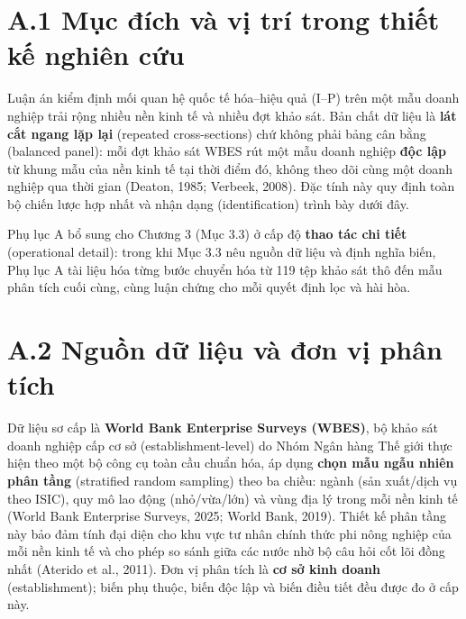 \documentclass[
  a4paper,
  13pt]{extreport}
\begin{document}
\hypertarget{a.1-mux1ee5c-ux111uxedch-vuxe0-vux1ecb-truxed-trong-thiux1ebft-kux1ebf-nghiuxean-cux1ee9u}{%
\section{A.1 Mục đích và vị trí trong thiết kế nghiên
cứu}\label{a.1-mux1ee5c-ux111uxedch-vuxe0-vux1ecb-truxed-trong-thiux1ebft-kux1ebf-nghiuxean-cux1ee9u}}

Luận án kiểm định mối quan hệ quốc tế hóa--hiệu quả (I--P) trên một mẫu
doanh nghiệp trải rộng nhiều nền kinh tế và nhiều đợt khảo sát. Bản chất
dữ liệu là \textbf{lát cắt ngang lặp lại} (repeated cross-sections) chứ
không phải bảng cân bằng (balanced panel): mỗi đợt khảo sát WBES rút một
mẫu doanh nghiệp \textbf{độc lập} từ khung mẫu của nền kinh tế tại thời
điểm đó, không theo dõi cùng một doanh nghiệp qua thời gian (Deaton,
1985; Verbeek, 2008). Đặc tính này quy định toàn bộ chiến lược hợp nhất
và nhận dạng (identification) trình bày dưới đây.

Phụ lục A bổ sung cho Chương 3 (Mục 3.3) ở cấp độ \textbf{thao tác chi
tiết} (operational detail): trong khi Mục 3.3 nêu nguồn dữ liệu và định
nghĩa biến, Phụ lục A tài liệu hóa từng bước chuyển hóa từ 119 tệp khảo
sát thô đến mẫu phân tích cuối cùng, cùng luận chứng cho mỗi quyết định
lọc và hài hòa.

\hypertarget{a.2-nguux1ed3n-dux1eef-liux1ec7u-vuxe0-ux111ux1a1n-vux1ecb-phuxe2n-tuxedch}{%
\section{A.2 Nguồn dữ liệu và đơn vị phân
tích}\label{a.2-nguux1ed3n-dux1eef-liux1ec7u-vuxe0-ux111ux1a1n-vux1ecb-phuxe2n-tuxedch}}

Dữ liệu sơ cấp là \textbf{World Bank Enterprise Surveys (WBES)}, bộ khảo
sát doanh nghiệp cấp cơ sở (establishment-level) do Nhóm Ngân hàng Thế
giới thực hiện theo một bộ công cụ toàn cầu chuẩn hóa, áp dụng
\textbf{chọn mẫu ngẫu nhiên phân tầng} (stratified random sampling) theo
ba chiều: ngành (sản xuất/dịch vụ theo ISIC), quy mô lao động
(nhỏ/vừa/lớn) và vùng địa lý trong mỗi nền kinh tế (World Bank
Enterprise Surveys, 2025; World Bank, 2019). Thiết kế phân tầng này bảo
đảm tính đại diện cho khu vực tư nhân chính thức phi nông nghiệp của mỗi
nền kinh tế và cho phép so sánh giữa các nước nhờ bộ câu hỏi cốt lõi
đồng nhất (Aterido et al., 2011). Đơn vị phân tích là \textbf{cơ sở kinh
doanh} (establishment); biến phụ thuộc, biến độc lập và biến điều tiết
đều được đo ở cấp này.
\end{document}
